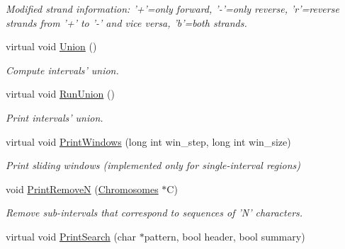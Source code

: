 \begin{DoxyCompactItemize}
\begin{DoxyCompactList}\small\item\em Modified strand information: '+'=only forward, '-\/'=only reverse, 'r'=reverse strands from '+' to '-\/' and vice versa, 'b'=both strands. \end{DoxyCompactList}\item 
\hypertarget{classGenomicRegion_a05cb47d38946b780f7eb585074ccf393}{
virtual void \hyperlink{classGenomicRegion_a05cb47d38946b780f7eb585074ccf393}{Union} ()}
\label{classGenomicRegion_a05cb47d38946b780f7eb585074ccf393}

\begin{DoxyCompactList}\small\item\em Compute intervals' union. \end{DoxyCompactList}\item 
\hypertarget{classGenomicRegion_a3d90c15accabfd5c0279f27f3513ba7c}{
virtual void \hyperlink{classGenomicRegion_a3d90c15accabfd5c0279f27f3513ba7c}{RunUnion} ()}
\label{classGenomicRegion_a3d90c15accabfd5c0279f27f3513ba7c}

\begin{DoxyCompactList}\small\item\em Print intervals' union. \end{DoxyCompactList}\item 
\hypertarget{classGenomicRegion_a3962ea71432f3977b1ac501e4e878480}{
virtual void \hyperlink{classGenomicRegion_a3962ea71432f3977b1ac501e4e878480}{PrintWindows} (long int win\_\-step, long int win\_\-size)}
\label{classGenomicRegion_a3962ea71432f3977b1ac501e4e878480}

\begin{DoxyCompactList}\small\item\em Print sliding windows (implemented only for single-\/interval regions) \end{DoxyCompactList}\item 
\hypertarget{classGenomicRegion_aa2a5b753401e9f9d64a30cfbbdf23f60}{
void \hyperlink{classGenomicRegion_aa2a5b753401e9f9d64a30cfbbdf23f60}{PrintRemoveN} (\hyperlink{classChromosomes}{Chromosomes} $\ast$C)}
\label{classGenomicRegion_aa2a5b753401e9f9d64a30cfbbdf23f60}

\begin{DoxyCompactList}\small\item\em Remove sub-\/intervals that correspond to sequences of 'N' characters. \end{DoxyCompactList}\item 
\hypertarget{classGenomicRegion_a7e2ae902016700fdc04c4607ed260edb}{
virtual void \hyperlink{classGenomicRegion_a7e2ae902016700fdc04c4607ed260edb}{PrintSearch} (char $\ast$pattern, bool header, bool summary)}
\label{classGenomicRegion_a7e2ae902016700fdc04c4607ed260edb}


\end{DoxyCompactItemize}
